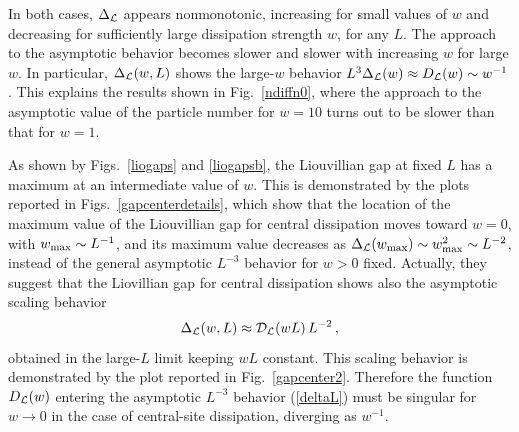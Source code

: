   In both cases, $\Delta_{\cal L}$ appears nonmonotonic, increasing for
  small values of $w$ and decreasing for sufficiently large dissipation
  strength $w$, for any $L$.  The approach to the asymptotic behavior
  becomes slower and slower with increasing $w$ for large $w$. In
  particular, $\Delta_{\cal L}(w,L)$ shows the large-$w$ behavior $L^3
  \Delta_{\cal L}(w)\approx D_{\cal L}(w)\sim w^{-1}$. This explains the
  results shown in Fig.~\ref{ndiffn0}, where the approach to the
  asymptotic value of the particle number for $w=10$ turns out to be
  slower than that for $w=1$.  
  
  As shown by Figs.~\ref{liogaps} and \ref{liogapsb}, the Liouvillian
  gap at fixed $L$ has a maximum at an intermediate value of
  $w$.   This is demonstrated by the plots reported in
  Figs.~\ref{gapcenterdetails}, which show that the location of the
  maximum value of the Liouvillian gap for central dissipation moves
  toward $w=0$, with $w_{\rm max}\sim L^{-1}$, and its maximum value
  decreases as $\Delta_{\cal L}(w_{\rm max})\sim w_{\rm max}^2\sim
  L^{-2}$, instead of the general asymptotic $L^{-3}$ behavior for $w>0$
  fixed. Actually, they suggest that the Liovillian gap for central
  dissipation shows also the asymptotic scaling behavior
  \begin{equation}    
  \Delta_{\cal L}(w,L)\approx {\cal D}_{\cal L}(wL) \,L^{-2}\,,
  \label{deltaLcenter}
  \end{equation}
  obtained in the large-$L$ limit keeping $wL$ constant.  This scaling
  behavior is demonstrated by the plot reported in
  Fig.~\ref{gapcenter2}.  Therefore the function $D_{\cal L}(w)$
  entering the asymptotic $L^{-3}$ behavior (\ref{deltaL}) must be
  singular for $w\to 0$ in the case of central-site dissipation,
  diverging as $w^{-1}$.
  
